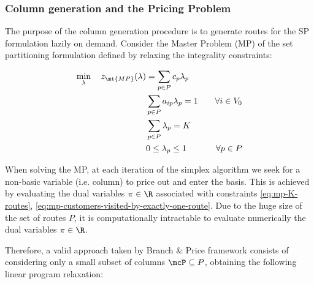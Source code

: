 \subsubsection{Column generation and the Pricing Problem}
\label{sec:column-generation-and-pricing-problem}

The purpose of the column generation procedure is to generate routes for the SP formulation lazily on demand.
Consider the Master Problem (MP) of the set partitioning formulation defined by relaxing the integrality constraints:

\begin{align}
	\min_{\lambda} \quad z_\mt{MP}(\lambda) & = \sum_{p \in P}  c_p \lambda_p \label{eq:mp-obj-func}                                                                                                                             \\
	                                        & \sum_{p \in P}  a_{ip} \lambda_p = 1                  & \quad \forall i \in V_0                                              \label{eq:mp-customers-visited-by-exactly-one-route} \\
	                                        & \sum_{p \in P} \lambda_{p} = K\label{eq:mp-K-routes}                                                                                                                               \\
	                                        & 0 \le \lambda_p \le 1                                  & \quad \forall p \in P \label{eq:mp-lambda-mip-var-bounds}
\end{align}


When solving the MP, at each iteration of the simplex algorithm we seek for a non-basic variable (i.e. column) to price out and enter the basis.
This is achieved by evaluating the dual variables $\pi \in \R$ associated with constraints \eqref{eq:mp-K-routes}, \eqref{eq:mp-customers-visited-by-exactly-one-route}.
Due to the huge size of the set of routes $P$, it is computationally intractable to evaluate numerically the dual variables $\pi \in \R$.

\medskip

Therefore, a valid approach taken by Branch \& Price framework consists of considering only a small subset of columns $\mcP \subseteq P$, obtaining the following linear program relaxation:


